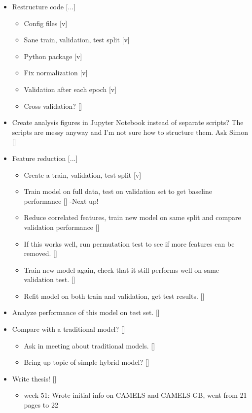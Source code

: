 \begin{itemize}
\item Restructure code [...] \begin{itemize}
\item Config files [v]
\item Sane train, validation, test split [v]
\item Python package [v]
\item Fix normalization [v]
\item Validation after each epoch [v]
\item Cross validation? []
\end{itemize}
\item Create analysis figures in Jupyter Notebook instead of separate scripts?
The scripts are messy anyway and I'm not sure how to structure them. Ask Simon []
\item Feature reduction [...]
\begin{itemize}
\item Create a train, validation, test split [v]
\item Train model on full data, test on validation set to get baseline performance [] -Next up!
\item Reduce correlated features, train new model on same split and compare validation performance []
\item If this works well, run permutation test to see if more features can be removed. []
\item Train new model again, check that it still performs well on same validation test. []
\item Refit model on both train and validation, get test results.  []
\end{itemize}
\item Analyze performance of this model on test set. []
\item Compare with a traditional model? []
    \begin{itemize}
        \item Ask in meeting about traditional models. []
        \item Bring up topic of simple hybrid model? []
    \end{itemize}
\item Write thesis! []
    \begin{itemize}
        \item week 51: Wrote initial info on CAMELS and CAMELS-GB, went from 21 pages to 22
    \end{itemize}
\end{itemize}
